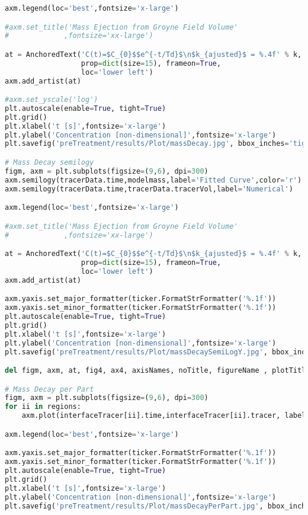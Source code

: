 \begin{lstlisting}[language=python]
axm.legend(loc='best',fontsize='x-large')

#axm.set_title('Mass Ejection from Groyne Field Volume'
#             ,fontsize='xx-large')

at = AnchoredText('C(t)=$C_{0}$$e^{-t/Td}$\n$k_{ajusted}$ = %.4f' % k,
                  prop=dict(size=15), frameon=True,
                  loc='lower left')
axm.add_artist(at)

#axm.set_yscale('log')
plt.autoscale(enable=True, tight=True)
plt.grid()
plt.xlabel('t [s]',fontsize='x-large')
plt.ylabel('Concentration [non-dimensional]',fontsize='x-large')
plt.savefig('preTreatment/results/Plot/massDecay.jpg', bbox_inches='tight')

# Mass Decay semilogy
figm, axm = plt.subplots(figsize=(9,6), dpi=300)
axm.semilogy(tracerData.time,modelmass,label='Fitted Curve',color='r')
axm.semilogy(tracerData.time,tracerData.tracerVol,label='Numerical')

axm.legend(loc='best',fontsize='x-large')

#axm.set_title('Mass Ejection from Groyne Field Volume'
#             ,fontsize='xx-large')

at = AnchoredText('C(t)=$C_{0}$$e^{-t/Td}$\n$k_{ajusted}$ = %.4f' % k,
                  prop=dict(size=15), frameon=True,
                  loc='lower left')
axm.add_artist(at)

axm.yaxis.set_major_formatter(ticker.FormatStrFormatter('%.1f'))
axm.yaxis.set_minor_formatter(ticker.FormatStrFormatter('%.1f'))
plt.autoscale(enable=True, tight=True)
plt.grid()
plt.xlabel('t [s]',fontsize='x-large')
plt.ylabel('Concentration [non-dimensional]',fontsize='x-large')
plt.savefig('preTreatment/results/Plot/massDecaySemiLogY.jpg', bbox_inches='tight')

del figm, axm, at, fig4, ax4, axisNames, noTitle, figureName , plotTitle

# Mass Decay per Part
figm, axm = plt.subplots(figsize=(9,6), dpi=300)
for ii in regions:
    axm.plot(interfaceTracer[ii].time,interfaceTracer[ii].tracer, label=ii)

axm.legend(loc='best',fontsize='x-large')

axm.yaxis.set_major_formatter(ticker.FormatStrFormatter('%.1f'))
axm.yaxis.set_minor_formatter(ticker.FormatStrFormatter('%.1f'))
plt.autoscale(enable=True, tight=True)
plt.grid()
plt.xlabel('t [s]',fontsize='x-large')
plt.ylabel('Concentration [non-dimensional]',fontsize='x-large')
plt.savefig('preTreatment/results/Plot/massDecayPerPart.jpg', bbox_inches='tight')


\end{lstlisting}
